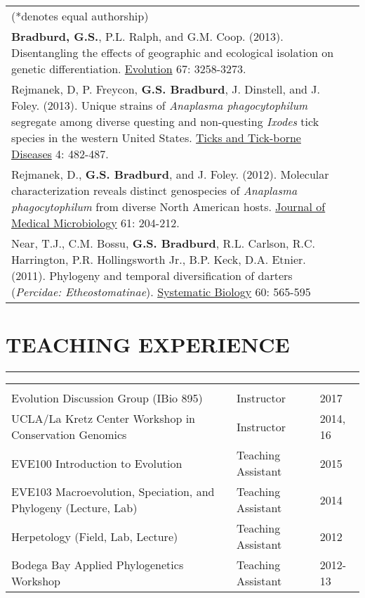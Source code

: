 \documentclass{article}
\begin{document}
\begin{tabular}{>{\everypar{\hangindent1cm}}p{}p{}}
\hspace{4.5mm} (*denotes equal authorship)&\\
%
\vspace{-0.1cm}
%
\textbf{Bradburd, G.S.}, P.L. Ralph, and G.M. Coop. (2013). Disentangling the effects of geographic and ecological isolation on genetic differentiation. \underline{Evolution} 67: 3258-3273. & \hfill \\
%
\vspace{-0.1cm}
%
Rejmanek, D, P. Freycon, \textbf{G.S. Bradburd}, J. Dinstell, and J. Foley.  (2013). Unique strains of \textit{Anaplasma phagocytophilum} segregate among diverse questing and non-questing \textit{Ixodes} tick species in the western United States.  \underline{Ticks and Tick-borne Diseases} 4: 482-487. & \hfill\\
%
\vspace{-0.1cm}
%
Rejmanek, D., \textbf{G.S. Bradburd}, and J. Foley.  (2012). Molecular characterization reveals distinct genospecies of \textit{Anaplasma phagocytophilum} from diverse North American hosts.	\underline{Journal of Medical Microbiology} 61: 204-212. & \hfill \\
%
\vspace{-0.1cm}
%
Near, T.J., C.M. Bossu, \textbf{G.S. Bradburd}, R.L. Carlson, R.C. Harrington, P.R. Hollingsworth Jr., B.P. Keck, D.A. Etnier.  (2011). Phylogeny and temporal diversification of darters (\textit{Percidae: Etheostomatinae}).  \underline{Systematic Biology} 60: 565-595& \hfill\\
%
\end{tabular}
%
%
\section*{TEACHING EXPERIENCE}
\vspace{-0.6cm}
\rule{470pt}{0.4pt}
%
\begin{tabular}{>{\everypar{\hangindent1cm}}p{}p{}p{}}
\hfill\\
Evolution Discussion Group (IBio 895) & Instructor & \hfill 2017 \\
UCLA/La Kretz Center Workshop in Conservation Genomics & Instructor & \hfill 2014, 16 \\
EVE100 Introduction to Evolution & Teaching Assistant & \hfill 2015	\\
EVE103 Macroevolution, Speciation, and Phylogeny (Lecture, Lab) & Teaching Assistant & \hfill 2014 \\
Herpetology (Field, Lab, Lecture) & Teaching Assistant & \hfill 2012\\
Bodega Bay Applied Phylogenetics Workshop & Teaching Assistant & \hfill 2012-13\\
\end{tabular}
%
%
\end{document}
